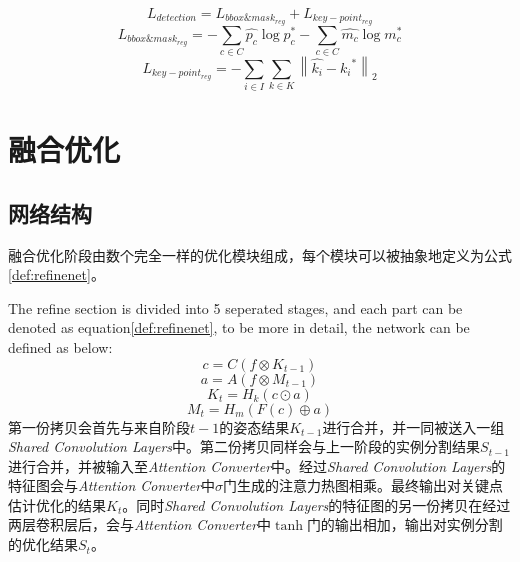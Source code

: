 \begin{equation}
\label{detection_loss}
L_{detection} = L_{bbox\&mask_{reg}} + L_{key-point_{reg}}
\end{equation}      
\begin{equation}
\label{bbox_mask_loss}
L_{bbox\&mask_{reg}} = -\sum_{c \in C}{\hat{p_c} \log{p_c^{*}}}  -\sum_{c \in C}{\hat{m_c} \log{m_c^{*}}}
\end{equation}
\begin{equation}
\label{coarse_key-point_loss}
L_{key-point_{reg}} = -\sum_{i \in I}\sum_{k \in K}{\left\| \hat{k_i} - {k_i}^{*} \right\|_2}
\end{equation}


\section{融合优化}
\label{sec:refine}
\subsection{网络结构}
\label{subsec:architecture}
融合优化阶段由数个完全一样的优化模块组成，每个模块可以被抽象地定义为公式\eqref{def:refinenet}。

The refine section is divided into 5 seperated stages, and each part can be denoted as equation\eqref{def:refinenet}, to be more in detail, the network can be defined as below:
\begin{equation}
c = C({f}\otimes{K_{t-1}})
\end{equation}
\begin{equation}
a = A(f\otimes{M_{t-1}})
\end{equation}
\begin{equation}
K_t = H_k(c\odot a)
\end{equation}
\begin{equation}
M_t = H_m(F(c) \oplus a)
\end{equation}
第一份拷贝会首先与来自阶段$t-1$的姿态结果$K_{t-1}$进行合并，并一同被送入一组\textit{Shared Convolution Layers}中。第二份拷贝同样会与上一阶段的实例分割结果$S_{t-1}$进行合并，并被输入至\textit{Attention Converter}中。经过\textit{Shared Convolution Layers}的特征图会与\textit{Attention Converter}中$\sigma$门生成的注意力热图相乘。最终输出对关键点估计优化的结果$K_t$。同时\textit{Shared Convolution Layers}的特征图的另一份拷贝在经过两层卷积层后，会与\textit{Attention Converter}中$\tanh$门的输出相加，输出对实例分割的优化结果$S_t$。

